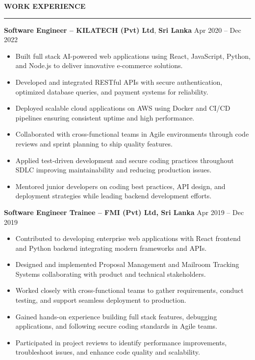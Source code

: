 \documentclass[10pt,letterpaper]{article}
\begin{document}
\vspace{8pt}

\textbf{WORK EXPERIENCE}\\[-8pt]
\noindent\rule{\textwidth}{1pt}

\vspace{-2pt}

\textbf{Software Engineer -- KILATECH (Pvt) Ltd}, \textbf{Sri Lanka} \hfill Apr 2020 -- Dec 2022

\vspace{-1pt}

\begin{itemize}
\item Built full stack AI-powered web applications using React, JavaScript, Python, and Node.js to deliver innovative e-commerce solutions.
\item Developed and integrated RESTful APIs with secure authentication, optimized database queries, and payment systems for reliability.
\item Deployed scalable cloud applications on AWS using Docker and CI/CD pipelines ensuring consistent uptime and high performance.
\item Collaborated with cross-functional teams in Agile environments through code reviews and sprint planning to ship quality features.
\item Applied test-driven development and secure coding practices throughout SDLC improving maintainability and reducing production issues.
\item Mentored junior developers on coding best practices, API design, and deployment strategies while leading backend development efforts.
\end{itemize}

\textbf{Software Engineer Trainee -- FMI (Pvt) Ltd, Sri Lanka} \hfill Apr 2019 -- Dec 2019

\vspace{-1pt}

\begin{itemize}
\item Contributed to developing enterprise web applications with React frontend and Python backend integrating modern frameworks and APIs.
\item Designed and implemented Proposal Management and Mailroom Tracking Systems collaborating with product and technical stakeholders.
\item Worked closely with cross-functional teams to gather requirements, conduct testing, and support seamless deployment to production.
\item Gained hands-on experience building full stack features, debugging applications, and following secure coding standards in Agile teams.
\item Participated in project reviews to identify performance improvements, troubleshoot issues, and enhance code quality and scalability.
\end{itemize}
\end{document}
